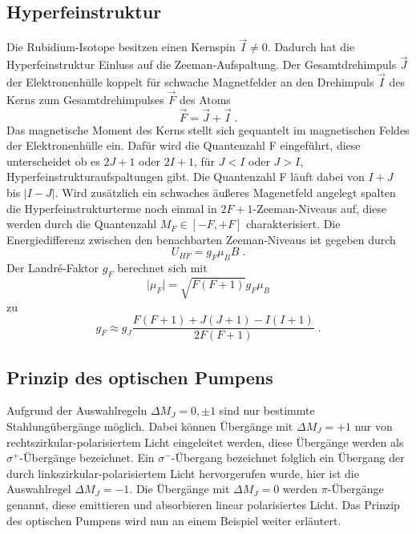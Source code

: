 \subsection{Hyperfeinstruktur}
Die Rubidium-Isotope besitzen einen Kernspin $\vec{I} \neq 0$. Dadurch hat die Hyperfeinstruktur 
Einluss auf die Zeeman-Aufspaltung. Der Gesamtdrehimpuls $\vec{J}$ der Elektronenhülle koppelt 
für schwache Magnetfelder an den Drehimpuls $\vec{I}$ des Kerns zum Gesamtdrehimpulses $\vec{F}$ 
des Atoms
\begin{equation}
\vec{F} = \vec{J} + \vec{I} \; .
\label{eq:F}
\end{equation}
Das magnetische Moment des Kerns stellt sich gequantelt im magnetischen Feldes der Elektronenhülle 
ein. Dafür wird die Quantenzahl F eingeführt, diese unterscheidet ob es $2J+1$ oder $2I+1$, 
für $J<I$ oder $J>I$, Hyperfeinstrukturaufspaltungen gibt. Die Quantenzahl F läuft dabei 
von $I+J$ bis $\lvert I-J \rvert$. Wird zusätzlich ein schwaches äußeres Magenetfeld angelegt 
spalten die Hyperfeinstrukturterme noch einmal in $2F+1$-Zeeman-Niveaus auf, diese werden durch 
die Quantenzahl $M_F \in [-F,+F]$ charakterisiert. Die Energiedifferenz zwischen den benachbarten 
Zeeman-Niveaus ist gegeben durch 
\begin{equation}
U_{HF} = g_F \mu_B B \; .	
\label{eq:UHF}
\end{equation}
Der Landr\'{e}-Faktor $g_F$ berechnet sich mit 
\begin{equation}
\lvert \mu_F \rvert = \sqrt{F(F+1)} g_F \mu_B	
\label{eq:muF}
\end{equation}
zu 
\begin{equation}
g_F \approx g_J \frac{F(F+1) + J(J+1) -I(I+1)}{2F(F+1)} \; .	
\end{equation}

\subsection{Prinzip des optischen Pumpens}
Aufgrund der Auswahlregeln $\Delta M_J = 0, \pm 1$ sind nur bestimmte Stahlungübergänge möglich. 
Dabei können Übergänge mit $\Delta M_J = +1$ nur von rechtszirkular-polarisiertem Licht 
eingeleitet werden, diese Übergänge werden als $\sigma^+$-Übergänge bezeichnet. Ein 
$\sigma^-$-Übergang bezeichnet folglich ein Übergang der durch linkszirkular-polarisiertem 
Licht hervorgerufen wurde, hier ist die Auswahlregel $\Delta M_J = -1$. Die Übergänge mit 
$\Delta M_J = 0$ werden $\pi$-Übergänge genannt, diese emittieren und absorbieren 
linear polarisiertes Licht. Das Prinzip des optischen Pumpens wird nun an einem 
Beispiel weiter erläutert.
